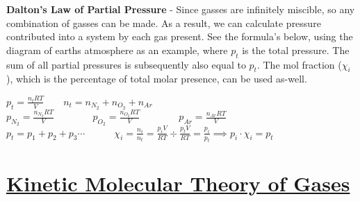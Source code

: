 \documentclass{article}
\begin{document}
\noindent\textbf{Dalton's Law of Partial Pressure} - Since gasses are infinitely miscible, so any combination of gasses can be made. As a result, we can calculate pressure contributed into a system by each gas present. See the formula's below, using the diagram of earths atmosphere as an example, where $p_t$ is the total pressure. The sum of all partial pressures is subsequently also equal to $p_t$. The mol fraction ($\chi_i$), which is the percentage of total molar presence, can be used as-well.
\begin{qq}

	\begin{center}
		$p_{t}=\frac{n_tRT}{V}\quad\quad n_t=n_{N_2}+n_{O_2}+n_{Ar}$\\
		\vspace{5pt}
		$p_{N_2}=\frac{n_{N_2}RT}{V}\quad\quad\quad \quad p_{O_2}=\frac{n_{O_2}RT}{V}\quad \quad\quad\quad p_{Ar}=\frac{n_{Ar}RT}{V}$\\
		\vspace{7.5pt}
		$p_t=p_1+p_2+p_3\cdots \quad\quad\quad \chi_i=\frac{n_i}{n_t}=\frac{p_iV}{RT}\div\frac{p_tV}{RT}=\frac{p_i}{p_t} \implies p_i\cdot\chi_i=p_t$
	\end{center}

\end{qq}
\begin{center}
\end{center}

\section*{\LARGE\uline{Kinetic Molecular Theory of Gases}}
\end{document}
